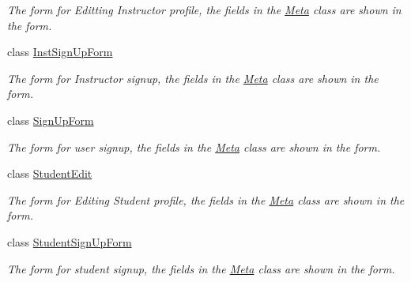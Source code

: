 \begin{DoxyCompactItemize}
\begin{DoxyCompactList}\small\item\em The form for Editting Instructor profile, the fields in the \hyperlink{classforms_1_1_instructor_edit_1_1_meta}{Meta} class are shown in the form. \end{DoxyCompactList}\item 
class \hyperlink{classforms_1_1_inst_sign_up_form}{Inst\+Sign\+Up\+Form}
\begin{DoxyCompactList}\small\item\em The form for Instructor signup, the fields in the \hyperlink{classforms_1_1_inst_sign_up_form_1_1_meta}{Meta} class are shown in the form. \end{DoxyCompactList}\item 
class \hyperlink{classforms_1_1_sign_up_form}{Sign\+Up\+Form}
\begin{DoxyCompactList}\small\item\em The form for user signup, the fields in the \hyperlink{classforms_1_1_sign_up_form_1_1_meta}{Meta} class are shown in the form. \end{DoxyCompactList}\item 
class \hyperlink{classforms_1_1_student_edit}{Student\+Edit}
\begin{DoxyCompactList}\small\item\em The form for Editing Student profile, the fields in the \hyperlink{classforms_1_1_student_edit_1_1_meta}{Meta} class are shown in the form. \end{DoxyCompactList}\item 
class \hyperlink{classforms_1_1_student_sign_up_form}{Student\+Sign\+Up\+Form}
\begin{DoxyCompactList}\small\item\em The form for student signup, the fields in the \hyperlink{classforms_1_1_student_sign_up_form_1_1_meta}{Meta} class are shown in the form. \end{DoxyCompactList}\end{DoxyCompactItemize}
